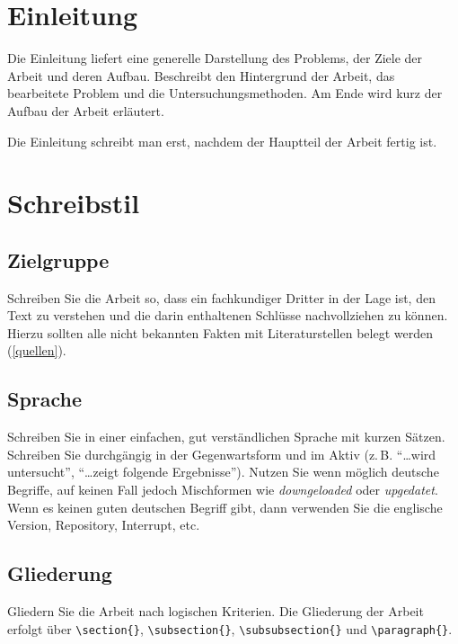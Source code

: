 \documentclass[conference,compsoc,final,a4paper]{IEEEtran}
\begin{document}
\section{Einleitung}
Die Einleitung liefert eine generelle Darstellung des Problems, der Ziele der Arbeit und deren Aufbau. Beschreibt den Hintergrund der Arbeit, das bearbeitete Problem und die Untersuchungsmethoden. Am Ende wird kurz der Aufbau der Arbeit erläutert.

Die Einleitung schreibt man erst, nachdem der Hauptteil der Arbeit fertig ist.

\section{Schreibstil}
\subsection{Zielgruppe}
Schreiben Sie die Arbeit so, dass ein fachkundiger Dritter in der Lage ist, den Text zu verstehen und die darin enthaltenen Schlüsse nachvollziehen zu können. Hierzu sollten alle nicht bekannten Fakten mit Literaturstellen belegt werden (\autoref{quellen}).

\subsection{Sprache}
Schreiben Sie in einer einfachen, gut verständlichen Sprache mit kurzen Sätzen. Schreiben Sie durchgängig in der Gegenwartsform und im Aktiv (z.\,B. \enquote{\dots wird untersucht}, \enquote{\dots zeigt folgende Ergebnisse}). Nutzen Sie wenn möglich deutsche Begriffe, auf keinen Fall jedoch Mischformen wie \emph{downgeloaded} oder \emph{upgedatet}. Wenn es keinen guten deutschen Begriff gibt, dann verwenden Sie die englische Version, \zb{} Repository, Interrupt, etc.

\subsection{Gliederung}
Gliedern Sie die Arbeit nach logischen Kriterien. Die Gliederung der Arbeit erfolgt über \lstinline+\section{}+, \lstinline+\subsection{}+, \lstinline+\subsubsection{}+ und \lstinline+\paragraph{}+.
\end{document}
